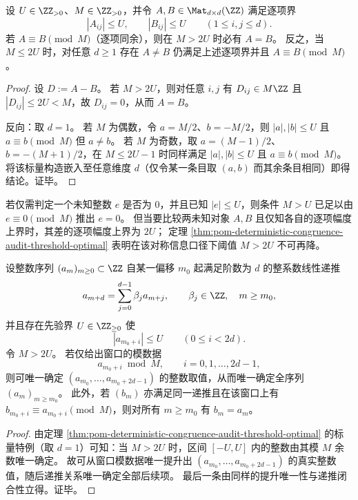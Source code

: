 \begin{theorem}[确定性同余审计阈值的最优性]\label{thm:pom-deterministic-congruence-audit-threshold-optimal}
设 \(U\in\ZZ_{>0}\)、\(M\in\ZZ_{>0}\)，并令 \(A,B\in\Mat_{d\times d}(\ZZ)\) 满足逐项界
\[
|A_{ij}|\le U,\qquad |B_{ij}|\le U\qquad(1\le i,j\le d).
\]
若 \(A\equiv B\pmod M\)（逐项同余），则在 \(M>2U\) 时必有 \(A=B\)。
反之，当 \(M\le 2U\) 时，对任意 \(d\ge 1\) 存在 \(A\neq B\) 仍满足上述逐项界并且 \(A\equiv B\pmod M\)。
\end{theorem}
\begin{proof}
设 \(D:=A-B\)。
若 \(M>2U\)，则对任意 \(i,j\) 有 \(D_{ij}\in M\ZZ\) 且 \(|D_{ij}|\le 2U<M\)，故 \(D_{ij}=0\)，从而 \(A=B\)。
\par
反向：取 \(d=1\)。
若 \(M\) 为偶数，令 \(a=M/2\)、\(b=-M/2\)，则 \(|a|,|b|\le U\) 且 \(a\equiv b\pmod M\) 但 \(a\neq b\)。
若 \(M\) 为奇数，取 \(a=(M-1)/2\)、\(b=-(M+1)/2\)，在 \(M\le 2U-1\) 时同样满足 \(|a|,|b|\le U\) 且 \(a\equiv b\pmod M\)。
将该标量构造嵌入至任意维度 \(d\)（仅令某一条目取 \((a,b)\) 而其余条目相同）即得结论。证毕。
\end{proof}

\begin{remark}[零性审计与同余提升的阈值差异]\label{rem:pom-congruence-zero-vs-lift-threshold}
若仅需判定一个未知整数 \(e\) 是否为 \(0\)，并且已知 \(|e|\le U\)，则条件 \(M>U\) 已足以由 \(e\equiv 0\pmod M\) 推出 \(e=0\)。
但当要比较两未知对象 \(A,B\) 且仅知各自的逐项幅度上界时，其差的逐项幅度上界为 \(2U\)；
定理 \ref{thm:pom-deterministic-congruence-audit-threshold-optimal} 表明在该对称信息口径下阈值 \(M>2U\) 不可再降。
\end{remark}

\begin{theorem}\label{thm:pom-congruence-2d-locking-cfinite}
设整数序列 \((a_m)_{m\ge 0}\subset\ZZ\) 自某一偏移 \(m_0\) 起满足阶数为 \(d\) 的整系数线性递推
\[
a_{m+d}=\sum_{j=0}^{d-1}\beta_j a_{m+j},\qquad \beta_j\in\ZZ,\quad m\ge m_0,
\]
并且存在先验界 \(U\in\ZZ_{\ge 0}\) 使
\[
|a_{m_0+i}|\le U\qquad(0\le i<2d).
\]
令 \(M>2U\)。
若仅给出窗口的模数据
\[
a_{m_0+i}\bmod M,\qquad i=0,1,\dots,2d-1,
\]
则可唯一确定 \((a_{m_0},\dots,a_{m_0+2d-1})\) 的整数取值，从而唯一确定全序列 \((a_m)_{m\ge m_0}\)。
此外，若 \((b_m)\) 亦满足同一递推且在该窗口上有 \(b_{m_0+i}\equiv a_{m_0+i}\pmod M\)，则对所有 \(m\ge m_0\) 有 \(b_m=a_m\)。
\end{theorem}
\begin{proof}
由定理 \ref{thm:pom-deterministic-congruence-audit-threshold-optimal} 的标量特例（取 \(d=1\)）可知：当 \(M>2U\) 时，区间 \([-U,U]\) 内的整数由其模 \(M\) 余数唯一确定。
故可从窗口模数据唯一提升出 \((a_{m_0},\dots,a_{m_0+2d-1})\) 的真实整数值，随后递推关系唯一确定全部后续项。
最后一条由同样的提升唯一性与递推闭合性立得。证毕。
\end{proof}

